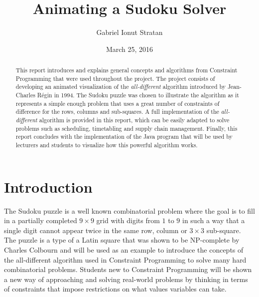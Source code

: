 \documentclass{l4proj}
\begin{document}
\title{Animating a Sudoku Solver}
\author{Gabriel Ionut Stratan}
\date{March 25, 2016}
\maketitle

\begin{abstract}
This report introduces and explains general concepts and algorithms from Constraint Programming that were used throughout the project. The project consists of developing an animated visualization of the \textit{all-different} algorithm introduced by Jean-Charles R\'egin \cite{regin1994filtering} in 1994. The Sudoku puzzle was chosen to illustrate the algorithm as it represents a simple enough problem that uses a great number of constraints of difference for the rows, columns and sub-squares. A full implementation of the \textit{all-different} algorithm is provided in this report, which can be easily adapted to solve problems such as scheduling, timetabling and supply chain management. Finally, this report concludes with the implementation of the Java program that will be used by lecturers and students to visualize how this powerful algorithm works.
\end{abstract}

\educationalconsent
%
%
\tableofcontents
\chapter{Introduction}
\label{chap1intro}

\noindent The Sudoku puzzle is a well known combinatorial problem where the goal is to fill in a partially completed $9 \times 9$ grid with digits from $1$ to $9$ in such a way that a single digit cannot appear twice in the same row, column or $3\times 3$ sub-square. The puzzle is a type of a Latin square that was shown to be NP-complete by Charles Colbourn \cite{colbourn1984complexity} and will be used as an example to introduce the concepts of the all-different algorithm used in Constraint Programming to solve many hard combinatorial problems. Students new to Constraint Programming will be shown a new way of approaching and solving real-world problems by thinking in terms of constraints that impose restrictions on what values variables can take.
\end{document}
